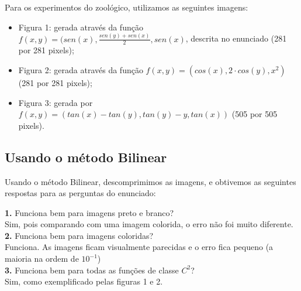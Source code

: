 \documentclass[12pt,letterpaper]{article}
\begin{document}
    Para os experimentos do zoológico, utilizamos as seguintes imagens:

    \begin{figure}[h]
    \end{figure}

    \begin{figure}[h]
    \end{figure}

    \begin{itemize}
        \item Figura 1: gerada através da função
        $f(x,y) = (sen(x), \frac{sen(y)+sen(x)}{2}, sen(x)$, descrita no enunciado (281 por 281 pixels);
        \item Figura 2: gerada através da função $f(x,y) = (cos(x), 2\cdot cos(y), x^2)$ (281 por 281 pixels);
        \item Figura 3: gerada por $f(x,y) = (tan(x) - tan(y), tan(y)- y, tan(x))$ (505 por 505 pixels).
    \end{itemize}

    \clearpage

    \subsection{Usando o método Bilinear}

    Usando o método Bilinear, descomprimimos as imagens, e obtivemos as seguintes respostas para as perguntas do enunciado:

    \textbf{1.} Funciona bem para imagens preto e branco?\\
    Sim, pois comparando com uma imagem colorida, o erro não foi muito diferente.\\

    \textbf{2.} Funciona bem para imagens coloridas?\\
    Funciona. As imagens ficam visualmente parecidas e o erro fica pequeno (a maioria na ordem de $10^{-1}$)\\

    \textbf{3.} Funciona bem para todas as funções de classe $C^2$?\\
    Sim, como exemplificado pelas figuras 1 e 2.\\
\end{document}
